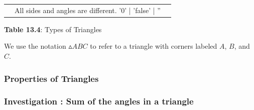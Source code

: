 \begin{table}[H]
\begin{center}
\begin{xtabular*}{\mytablewidth}[t]{|p{10\mystarwidth}|p{10\mystarwidth}|p{
10\mystarwidth}|}
                 &
    
    
        All sides and angles are different.%
'0' | 'false' | ''
     \tabularnewline{}
    \end{xtabular*}
      \end{center}
    \begin{center}{\small\bfseries Table 13.4}: Types of Triangles\end{center}
    
    \addtocounter{footnote}{-0}
    
    \par
  
        \label{m38380*id317683}We use the notation \begin{math}▵ABC\end{math} to
refer to a triangle with corners labeled \begin{math}A\end{math},
\begin{math}B\end{math}, and \begin{math}C\end{math}.\par 
        \label{m38380*uid40}
        \subsubsection{ Properties of Triangles}
        \nopagebreak
        
          
\label{m38380*secfhsst!!!underscore!!!id655}
        \subsubsection{  Investigation : Sum of the angles in a triangle }
        \nopagebreak
        

\end{table}
